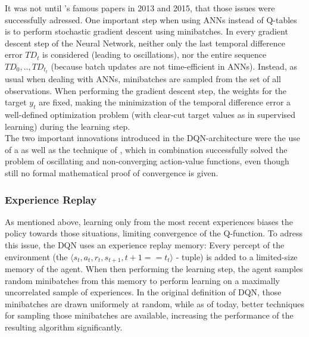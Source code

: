 It was not until 's famous papers in 2013\cite{mnih_playing_2013} and 2015\cite{mnih_human-level_2015}, that those issues were successfully adressed. One important step when using ANNs instead of Q-tables is to perform stochastic gradient descent using minibatches. In every gradient descent step of the Neural Network, neither only the last temporal difference error $TD_t$ is considered (leading to oscillations), nor the entire sequence $TD_0, .., TD_{t_t}$ (because batch updates are not time-efficient in ANNs). Instead, as usual when dealing with ANNs, minibatches are sampled from the set of all observations. When performing the gradient descent step, the weights for the target $y_t$ are fixed, making the minimization of the temporal difference error a well-defined optimization problem (with clear-cut target values as in supervised learning) during the learning step.\\


\noindent The two important innovations introduced in the DQN-architecture were the use of a  as well as the technique of , which in combination successfully solved the problem of oscillating and non-converging action-value functions, even though still no formal mathematical proof of convergence is given. %

\subsubsection*{Experience Replay}
As mentioned above, learning only from the most recent experiences biases the policy towards those situations, limiting convergence of the Q-function. To adress this issue, the DQN uses an experience replay memory: Every percept of the environment (the $\langle s_t, a_t, r_t, s_{t+1}, t+1==t_t \rangle$ - tuple) is added to a limited-size memory of the agent. When then performing the learning step, the agent samples random minibatches from this memory to perform learning on a maximally uncorrelated sample of experiences. In the original definition of DQN, those minibatches are drawn uniformely at random, while as of today, better techniques for sampling those minibatches are available\cite{schaul_prioritized_2015}, increasing the performance of the resulting algorithm significantly. %

